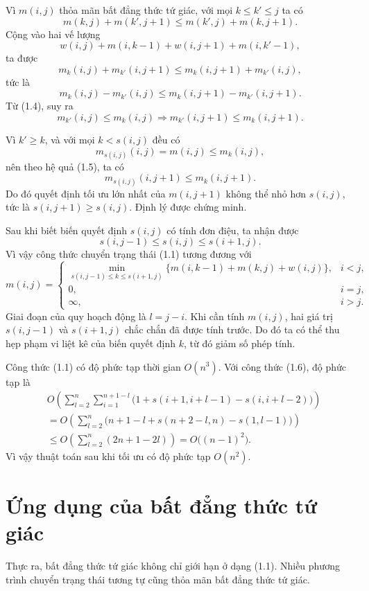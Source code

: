 \documentclass[11pt]{article}
\begin{document}
Vì $m(i,j)$ thỏa mãn bất đẳng thức tứ giác, với mọi $k\le k'\le j$ ta có
\[
  m(k,j)+m(k',j+1)\le m(k',j)+m(k,j+1).
\]
Cộng vào hai vế lượng
\[
  w(i,j)+m(i,k-1)+w(i,j+1)+m(i,k'-1),
\]
ta được
\[
  m_k(i,j)+m_{k'}(i,j+1)
  \le m_k(i,j+1)+m_{k'}(i,j),
\]
tức là
\[
  m_k(i,j)-m_{k'}(i,j)
  \le
  m_k(i,j+1)-m_{k'}(i,j+1).
  \tag{1.4}
\]
Từ (1.4), suy ra
\[
  m_{k'}(i,j)\le m_k(i,j)
  \Longrightarrow
  m_{k'}(i,j+1)\le m_k(i,j+1).
  \tag{1.5}
\]

Vì $k'\ge k$, và với mọi $k<s(i,j)$ đều có
\[
  m_{s(i,j)}(i,j)=m(i,j)\le m_k(i,j),
\]
nên theo hệ quả (1.5), ta có
\[
  m_{s(i,j)}(i,j+1)\le m_k(i,j+1).
\]
Do đó quyết định tối ưu lớn nhất của $m(i,j+1)$ không thể nhỏ hơn $s(i,j)$,
tức là $s(i,j+1)\ge s(i,j)$. Định lý được chứng minh.

Sau khi biết biến quyết định $s(i,j)$ có tính đơn điệu, ta nhận được
\[
  s(i,j-1)\le s(i,j)\le s(i+1,j).
\]
Vì vậy công thức chuyển trạng thái (1.1) tương đương với
\[
  m(i,j)=
  \begin{cases}
    \displaystyle
    \min_{s(i,j-1)\le k\le s(i+1,j)}
      \{m(i,k-1)+m(k,j)+w(i,j)\}, & i<j,\\[0.8em]
    0, & i=j,\\
    \infty, & i>j.
  \end{cases}
  \tag{1.6}
\]
Giai đoạn của quy hoạch động là $l=j-i$. Khi cần tính $m(i,j)$, hai giá trị
$s(i,j-1)$ và $s(i+1,j)$ chắc chắn đã được tính trước. Do đó ta có thể thu
hẹp phạm vi liệt kê của biến quyết định $k$, từ đó giảm số phép tính.

Công thức (1.1) có độ phức tạp thời gian $O(n^3)$. Với công thức (1.6), độ
phức tạp là
\[
\begin{aligned}
  &O\left(
    \sum_{l=2}^{n}\sum_{i=1}^{n+1-l}
    \bigl(1+s(i+1,i+l-1)-s(i,i+l-2)\bigr)
  \right)\\
  &=
  O\left(
    \sum_{l=2}^{n}
    \bigl(n+1-l+s(n+2-l,n)-s(1,l-1)\bigr)
  \right)\\
  &\le
  O\left(
    \sum_{l=2}^{n} (2n+1-2l)
  \right)
  =
  O\bigl((n-1)^2\bigr).
\end{aligned}
\]
Vì vậy thuật toán sau khi tối ưu có độ phức tạp $O(n^2)$.

\section{Ứng dụng của bất đẳng thức tứ giác}

Thực ra, bất đẳng thức tứ giác không chỉ giới hạn ở dạng (1.1). Nhiều phương
trình chuyển trạng thái tương tự cũng thỏa mãn bất đẳng thức tứ giác.
\end{document}
